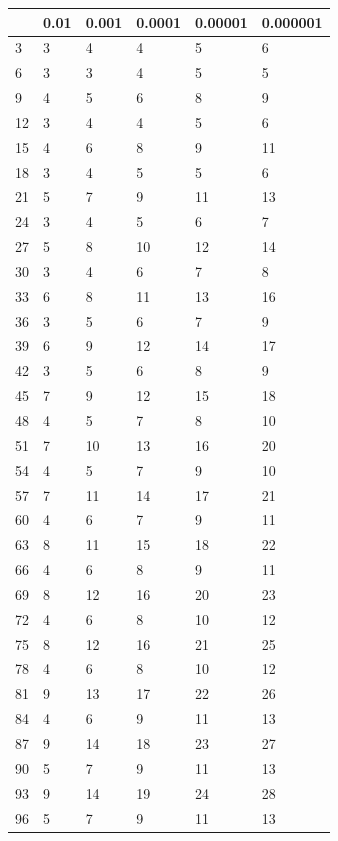 \documentclass{article}
\begin{document}
\begin{table}[H]
\centering
\begin{tabular}{|l|l|l|l|l|l|}
\hline
& 0.01 & 0.001 & 0.0001 & 0.00001 & 0.000001 \\ \hline
3 & 3 & 4 & 4 & 5 & 6 \\ \hline
6 & 3 & 3 & 4 & 5 & 5 \\ \hline
9 & 4 & 5 & 6 & 8 & 9 \\ \hline
12 & 3 & 4 & 4 & 5 & 6 \\ \hline
15 & 4 & 6 & 8 & 9 & 11 \\ \hline
18 & 3 & 4 & 5 & 5 & 6 \\ \hline
21 & 5 & 7 & 9 & 11 & 13 \\ \hline
24 & 3 & 4 & 5 & 6 & 7 \\ \hline
27 & 5 & 8 & 10 & 12 & 14 \\ \hline
30 & 3 & 4 & 6 & 7 & 8 \\ \hline
33 & 6 & 8 & 11 & 13 & 16 \\ \hline
36 & 3 & 5 & 6 & 7 & 9 \\ \hline
39 & 6 & 9 & 12 & 14 & 17 \\ \hline
42 & 3 & 5 & 6 & 8 & 9 \\ \hline
45 & 7 & 9 & 12 & 15 & 18 \\ \hline
48 & 4 & 5 & 7 & 8 & 10 \\ \hline
51 & 7 & 10 & 13 & 16 & 20 \\ \hline
54 & 4 & 5 & 7 & 9 & 10 \\ \hline
57 & 7 & 11 & 14 & 17 & 21 \\ \hline
60 & 4 & 6 & 7 & 9 & 11 \\ \hline
63 & 8 & 11 & 15 & 18 & 22 \\ \hline
66 & 4 & 6 & 8 & 9 & 11 \\ \hline
69 & 8 & 12 & 16 & 20 & 23 \\ \hline
72 & 4 & 6 & 8 & 10 & 12 \\ \hline
75 & 8 & 12 & 16 & 21 & 25 \\ \hline
78 & 4 & 6 & 8 & 10 & 12 \\ \hline
81 & 9 & 13 & 17 & 22 & 26 \\ \hline
84 & 4 & 6 & 9 & 11 & 13 \\ \hline
87 & 9 & 14 & 18 & 23 & 27 \\ \hline
90 & 5 & 7 & 9 & 11 & 13 \\ \hline
93 & 9 & 14 & 19 & 24 & 28 \\ \hline
96 & 5 & 7 & 9 & 11 & 13 \\ \hline

\end{tabular}
\end{table}
\end{document}
